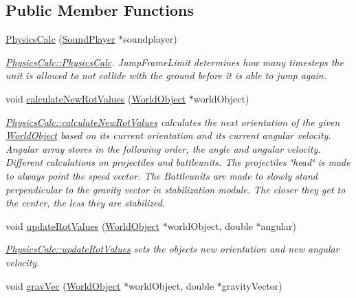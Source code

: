 \subsection*{Public Member Functions}
\begin{DoxyCompactItemize}
\item 
\hyperlink{class_physics_calc_a806b2675198437e8271ab82eda0e6746}{Physics\+Calc} (\hyperlink{class_sound_player}{Sound\+Player} $\ast$soundplayer)
\begin{DoxyCompactList}\small\item\em \hyperlink{class_physics_calc_a806b2675198437e8271ab82eda0e6746}{Physics\+Calc\+::\+Physics\+Calc}. Jump\+Frame\+Limit determines how many timesteps the unit is allowed to not collide with the ground before it is able to jump again. \end{DoxyCompactList}\item 
void \hyperlink{class_physics_calc_a7ef2a6c520d3d0a815c333c1a08cb4df}{calculate\+New\+Rot\+Values} (\hyperlink{class_world_object}{World\+Object} $\ast$world\+Object)
\begin{DoxyCompactList}\small\item\em \hyperlink{class_physics_calc_a7ef2a6c520d3d0a815c333c1a08cb4df}{Physics\+Calc\+::calculate\+New\+Rot\+Values} calculates the next orientation of the given \hyperlink{class_world_object}{World\+Object} based on it\textquotesingle{}s current orientation and its current angular velocity. Angular array stores in the following order, the angle and angular velocity. Different calculations on projectiles and battleunits. The projectiles \char`\"{}head\char`\"{} is made to always point the speed vector. The Battleunits are made to slowly stand perpendicular to the gravity vector in stabilization module. The closer they get to the center, the less they are stabilized. \end{DoxyCompactList}\item 
void \hyperlink{class_physics_calc_afaa9837f796074797ea731066f09dfc3}{update\+Rot\+Values} (\hyperlink{class_world_object}{World\+Object} $\ast$world\+Object, double $\ast$angular)
\begin{DoxyCompactList}\small\item\em \hyperlink{class_physics_calc_afaa9837f796074797ea731066f09dfc3}{Physics\+Calc\+::update\+Rot\+Values} sets the objects new orientation and new angular velocity. \end{DoxyCompactList}\item 
void \hyperlink{class_physics_calc_ad1eaa72eeff1b031b08db33730d8decb}{grav\+Vec} (\hyperlink{class_world_object}{World\+Object} $\ast$world\+Object, double $\ast$gravity\+Vector)

\end{DoxyCompactItemize}
